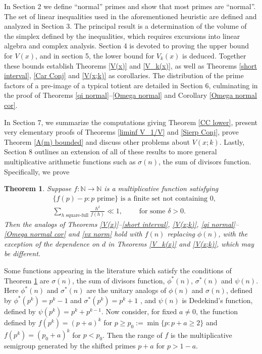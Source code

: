 \documentclass[11pt]{amsart}
\theoremstyle{remark}
\theoremstyle{plain}
\newtheorem{thm}{Theorem}
\numberwithin{equation}{section}
\newcommand{\NN}{{\mathbb N}}
\newcommand{\del}{\ensuremath{\delta}}
\renewcommand{\(}{\left(}
\renewcommand{\)}{\right)}
\renewcommand{\ge}{\geqslant}
\begin{document}
In Section 2 we define ``normal'' primes and show that most primes
are ``normal''.
The set of linear inequalities used in the aforementioned heuristic are
defined and analyzed in Section 3.
The principal result is a determination of
the volume of the simplex defined by the inequalities, which
requires excursions into linear algebra and complex analysis.
Section 4 is devoted to proving the upper bound for
$V(x)$, and in section 5, the lower bound for $V_k(x)$ is deduced.
Together these bounds establish Theorems \ref{V(x)} and \ref{V_k(x)},
as well as Theorems \ref{short interval}, \ref{Car Conj} and
\ref{V(x;k)} as corollaries.
The distribution of the prime factors of a pre-image of a typical totient
are detailed in Section 6, culminating in the proof of Theorems
\ref{qi normal}--\ref{Omega normal} and Corollary \ref{Omega normal cor}.

In Section 7, we summarize the
computations giving Theorem \ref{CC lower}, present very
elementary proofs of Theorems \ref{liminf V_1/V} and \ref{Sierp Conj},
prove Theorem \ref{A(m) bounded} and discuss 
other problems about $V(x;k)$.  Lastly, Section 8 outlines
an extension of all of these results to more general
multiplicative arithmetic functions such as $\sigma(n)$, the sum of
divisors function.  Specifically, we prove

\begin{thm}\label{general f}
Suppose $f:\NN\to \NN$ is a multiplicative function satisfying
\begin{align}
&\{ f(p)-p:p \text{ prime} \} \text{ is a finite set not containing 0,}
 \label{fp} \\
&\sum_{h\text{ square-full} }
 \frac{h^\del}{f(h)} \ll 1, \qquad \text{ for some } \del>0.
\label{f lower}
\end{align}
Then the analogs of
Theorems \ref{V(x)}--\ref{short interval}, \ref{V(x;k)}, 
\ref{qi normal}--\ref{Omega normal cor} and \ref{vx norm}
hold with $f(n)$ replacing $\phi(n)$, with the exception
of the dependence on $d$ in Theorems \ref{V_k(x)} and
\ref{V(x;k)}, which may be different.
\end{thm}


Some functions appearing in the literature which satisfy the conditions of
Theorem \ref{general f} are $\sigma(n)$, the sum of divisors function,
$\phi^*(n)$, $\sigma^*(n)$ and $\psi(n)$.  Here $\phi^*(n)$ and $\sigma^*(n)$
are the unitary analogs of $\phi(n)$ and $\sigma(n)$, defined by
$\phi^*(p^k)=p^k-1$ and $\sigma^*(p^k)=p^k+1$ \cite{Co},
 and $\psi(n)$ is Dedekind's
function, defined by $\psi(p^k)=p^k+p^{k-1}$.
Now consider, for fixed $a\ne 0$, the function defined by $f(p^k)=(p+a)^k$ 
for $p \ge p_0:=\min\{p: p+a\ge 2\}$ and $f(p^k)=(p_0+a)^k$ for $p < p_0$.
Then the range of $f$ is the multiplicative semigroup generated by the shifted primes
$p+a$ for $p>1-a$.  
\end{document}

